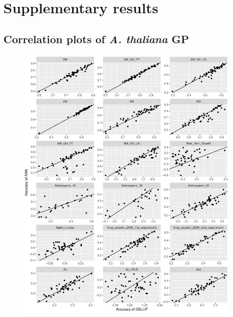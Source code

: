 
\chapter{Supplementary results} %

\label{AppendixD} %

\section{Correlation plots of \textit{A. thaliana} GP}  \label{AC:gp_res}
  
\begin{figure}[H]
  \centering \includegraphics[height=0.99\textheight, width=0.99\textwidth]{Figures/cor_plots_0}
  \decoRule
 \label{fig:bla}
\end{figure}

